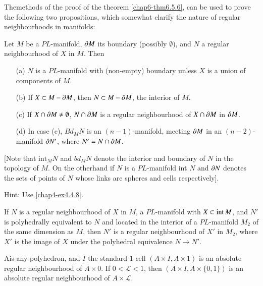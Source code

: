 The\pageoriginale methods of the proof of the theorem \ref{chap6-thm6.5.6}, can be used to prove the following two propositions, which somewhat clarify the nature of regular neighbourhoods in manifolds:

\begin{ex}\label{chap6-ex6.5.12}
Let $M$ be a $PL$-manifold, $\partial M$ its boundary (possibly $\emptyset$), and $N$ a regular neighbourhood of $X$ in $M$. Then
\begin{itemize}
\item[(a)] $N$ is a $PL$-manifold with (non-empty) boundary unless $X$ is a union of components of $M$.

\item[(b)] If $X\subset M-\partial M$, then $N\subset M-\partial M$, the interior of $M$.

\item[(c)] If $X\cap \partial M\neq \emptyset$, $N\cap \partial M$ is a regular neighbourhood of $X\cap \partial M$ in $\partial M$.

\item[(d)] In case (c), $Bd_{M}N$ is an $(n-1)$-manifold, meeting $\partial M$ in an $(n-2)$-manifold $\partial N'$, where $N'=N\cap \partial M$.
\end{itemize}

[Note that $\text{int}_MN$ and $bd_{M}N$ denote the interior and boundary of $N$ in the topology of $M$. On the otherhand if $N$ is a $PL$-manifold int $N$ and $\partial N$ denotes the sets of points of $N$ whose links are spheres and cells respectively].

Hint: Use \ref{chap4-ex4.4.8}.
\end{ex}

\begin{ex}\label{chap6-ex6.5.13}
If $N$ is a regular neighbourhood of $X$ in $M$, a $PL$-manifold with $X\subset \text{int\,}M$, and $N'$ is polyhedrally equivalent to $N$ and located in the interior of a $PL$-manifold $M_{2}$ of the same dimension as $M$, then $N'$ is a regular neighbourhood of $X'$ in $M_{2}$, where $X'$ is the image of $X$ under the polyhedral equivalence $N\to N'$.
\end{ex}

\begin{ex}\label{chap6-ex6.5.14}
A\pageoriginale is any polyhedron, and $I$ the standard $1$-cell $(A\times I,A\times 1)$ is an absolute regular neighbourhood of $A\times 0$. If $0< \mathcal{L}<1$, then $(A\times I,A\times\{0,1\})$ is an absolute regular neighbourhood of $A\times \mathcal{L}$.
\end{ex}

